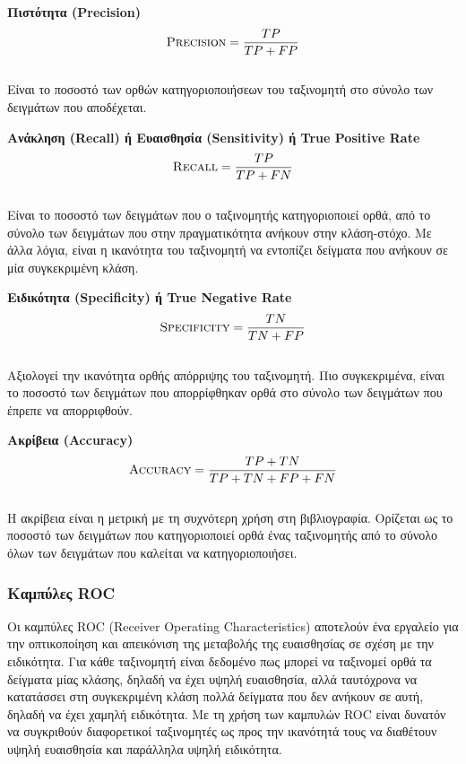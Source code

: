 \begin{description}

\item\textbf{Πιστότητα (Precision)}
\\ 
\begin{equation} 
\textsc{Precision}=\frac{TP}{TP+FP} 
\end{equation} 
\\
Είναι το ποσοστό των ορθών κατηγοριοποιήσεων του ταξινομητή στο σύνολο των δειγμάτων που αποδέχεται.
\\
\item \textbf{Ανάκληση (Recall) ή Ευαισθησία (Sensitivity) ή True Positive Rate}
\\
\begin{equation} 
\textsc{Recall}=\frac{TP}{TP+FN} 
\end{equation}
\\
Είναι το ποσοστό των δειγμάτων που ο ταξινομητής κατηγοριοποιεί ορθά, από το σύνολο των δειγμάτων που στην πραγματικότητα ανήκουν στην κλάση-στόχο. Με άλλα λόγια, είναι η ικανότητα του ταξινομητή να εντοπίζει δείγματα που ανήκουν σε μία συγκεκριμένη κλάση.
\\
\item\textbf{Ειδικότητα (Specificity) ή True Negative Rate}
\\
\begin{equation}
\textsc{Specificity}=\frac{TN}{TN+FP}  
\end{equation} 
\\
Αξιολογεί την ικανότητα ορθής απόρριψης του ταξινομητή. Πιο συγκεκριμένα, είναι το ποσοστό των δειγμάτων που απορρίφθηκαν ορθά στο σύνολο των δειγμάτων που έπρεπε να απορριφθούν.
\\
\item\textbf{Ακρίβεια (Accuracy)}
\\
\begin{equation} 
\textsc{Accuracy}=\frac{TP+TN}{TP+TN+FP+FN} 
\end{equation} 
\\
Η ακρίβεια είναι η μετρική με τη συχνότερη χρήση στη βιβλιογραφία. Ορίζεται ως το ποσοστό των δειγμάτων που κατηγοριοποιεί ορθά ένας ταξινομητής από το σύνολο όλων των δειγμάτων που καλείται να κατηγοριοποιήσει.

\end{description}

\subsubsection{Καμπύλες ROC}
Οι καμπύλες ROC (Receiver Operating Characteristics) αποτελούν ένα εργαλείο για την οπτικοποίηση και απεικόνιση της μεταβολής της ευαισθησίας σε σχέση με την ειδικότητα. Για κάθε ταξινομητή είναι δεδομένο πως μπορεί να ταξινομεί ορθά τα δείγματα μίας κλάσης, δηλαδή να έχει υψηλή ευαισθησία, αλλά ταυτόχρονα να κατατάσσει στη συγκεκριμένη κλάση πολλά δείγματα που δεν ανήκουν σε αυτή, δηλαδή να έχει χαμηλή ειδικότητα. Με τη χρήση των καμπυλών ROC είναι δυνατόν να συγκριθούν διαφορετικοί ταξινομητές ως προς την ικανότητά τους να διαθέτουν υψηλή ευαισθησία και παράλληλα υψηλή ειδικότητα.

